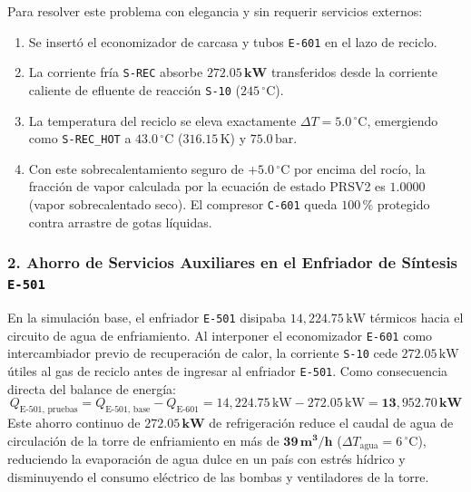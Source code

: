 \documentclass[11pt,a4paper]{article}
\begin{document}
Para resolver este problema con elegancia y sin requerir servicios externos:
\begin{enumerate}
    \item Se insertó el economizador de carcasa y tubos \texttt{E-601} en el lazo de reciclo.
    \item La corriente fría \texttt{S-REC} absorbe $\mathbf{272.05\,\text{kW}}$ transferidos desde la corriente caliente de efluente de reacción \texttt{S-10} ($245\,^\circ\text{C}$).
    \item La temperatura del reciclo se eleva exactamente $\Delta T = 5.0\,^\circ\text{C}$, emergiendo como \texttt{S-REC\_HOT} a \textbf{$43.0\,^\circ\text{C}$} ($316.15\,\text{K}$) y $75.0\,\text{bar}$.
    \item Con este sobrecalentamiento seguro de $+5.0\,^\circ\text{C}$ por encima del rocío, la fracción de vapor calculada por la ecuación de estado PRSV2 es $1.0000$ (vapor sobrecalentado seco). El compresor \texttt{C-601} queda $100\,\%$ protegido contra arrastre de gotas líquidas.
\end{enumerate}

\subsubsection{2. Ahorro de Servicios Auxiliares en el Enfriador de Síntesis \texttt{E-501}}
En la simulación base, el enfriador \texttt{E-501} disipaba $14{,}224.75\,\text{kW}$ térmicos hacia el circuito de agua de enfriamiento.
Al interponer el economizador \texttt{E-601} como intercambiador previo de recuperación de calor, la corriente \texttt{S-10} cede $272.05\,\text{kW}$ útiles al gas de reciclo antes de ingresar al enfriador \texttt{E-501}. Como consecuencia directa del balance de energía:
\begin{equation}
    Q_{\text{E-501, pruebas}} = Q_{\text{E-501, base}} - Q_{\text{E-601}} = 14{,}224.75\,\text{kW} - 272.05\,\text{kW} = \mathbf{13{,}952.70\,\text{kW}}
\end{equation}
Este ahorro continuo de $\mathbf{272.05\,\text{kW}}$ de refrigeración reduce el caudal de agua de circulación de la torre de enfriamiento en más de $\mathbf{39\,\text{m}^3\text{/h}}$ ($\Delta T_{\text{agua}} = 6\,^\circ\text{C}$), reduciendo la evaporación de agua dulce en un país con estrés hídrico y disminuyendo el consumo eléctrico de las bombas y ventiladores de la torre.
\end{document}
